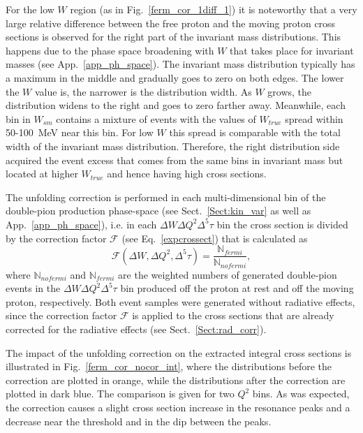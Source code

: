 For the low $W$ region (as in Fig.~\ref{ferm_cor_1diff_1}) it is noteworthy that a very large relative difference between the free proton and the moving proton cross sections is observed for the right part of the invariant mass distributions. This happens due to the phase space broadening with $W$ that takes place for invariant masses (see App.~\ref{app_ph_space}). The invariant mass distribution typically has a maximum in the middle and gradually goes to zero on both edges. The lower the $W$ value is, the narrower is the distribution width. As $W$ grows, the distribution widens to the right and goes to zero farther away. Meanwhile, each bin in $W_{sm}$ contains a mixture of events with the values of $W_{true}$ spread within 50-100~MeV near this bin. For low $W$ this spread is comparable with the total  width of the invariant mass distribution. Therefore, the right distribution side acquired the event excess that comes from the same bins in invariant mass but located at higher $W_{true}$ and hence having high cross sections.



The unfolding correction is performed in each multi-dimensional bin of the double-pion production phase-space (see Sect.~\ref{Sect:kin_var} as well as App.~\ref{app_ph_space}), i.e. in each $\Delta W \Delta Q^{2}\Delta^{5}\tau$ bin the cross section is divided by the correction factor $\mathcal{F}$ (see  Eq.~\eqref{expcrossect}) that is calculated as
\begin{equation}
\mathcal{F}(\Delta W, \Delta Q^{2},\Delta^{5}\tau) = \frac{\mathbb{N}_{fermi}}{\mathbb{N}_{nofermi}},
\label{eq:ferm_corr}
\end{equation}
where $\mathbb{N}_{nofermi}$ and $\mathbb{N}_{fermi}$ are the weighted numbers of generated double-pion events in the $\Delta W \Delta Q^{2}\Delta^{5}\tau$ bin produced off the proton at rest and off the moving proton, respectively. Both event samples were generated without radiative effects, since the correction factor $\mathcal{F}$ is applied to the cross sections that are already corrected for the radiative effects (see Sect.~\ref{Sect:rad_corr}).


The impact of the unfolding correction on the extracted integral cross sections is illustrated in Fig.~\ref{ferm_cor_nocor_int}, where the distributions before the correction are plotted in orange, while the distributions after the correction are plotted in dark blue. The comparison is given for two $Q^{2}$ bins. As was expected, the correction causes a slight cross section increase in the resonance peaks and a decrease near the threshold and in the dip between the peaks. 

